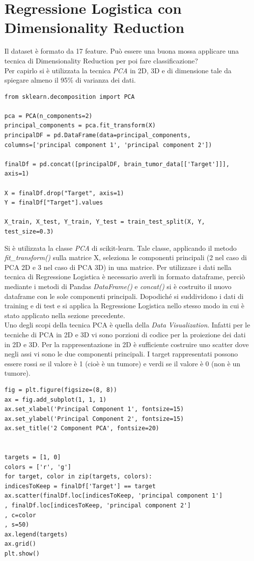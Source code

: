 \section{Regressione Logistica con Dimensionality Reduction}
Il dataset è formato da 17 feature. Può essere una buona mossa applicare una tecnica di Dimensionality Reduction per poi fare classificazione? \\
Per capirlo si è utilizzata la tecnica \textit{PCA} in 2D, 3D e di dimensione tale da spiegare almeno il 95\% di varianza dei dati.
\begin{lstlisting}
from sklearn.decomposition import PCA

pca = PCA(n_components=2)
principal_components = pca.fit_transform(X)
principalDF = pd.DataFrame(data=principal_components,
columns=['principal component 1', 'principal component 2'])

finalDf = pd.concat([principalDF, brain_tumor_data[['Target']]], axis=1)

X = finalDf.drop("Target", axis=1)
Y = finalDf["Target"].values

X_train, X_test, Y_train, Y_test = train_test_split(X, Y, test_size=0.3)
\end{lstlisting}
Si è utilizzata la classe \textit{PCA} di scikit-learn. Tale classe, applicando il metodo \textit{fit\_transform()} sulla matrice X, seleziona le componenti principali (2 nel caso di PCA 2D e 3 nel caso di PCA 3D) in una matrice. Per utilizzare i dati nella tecnica di Regressione Logistica è necessario averli in formato dataframe, perciò mediante i metodi di Pandas \textit{DataFrame()} e \textit{concat()} si è costruito il nuovo dataframe con le sole componenti principali. Dopodiché si suddividono i dati di training e di test e si applica la Regressione Logistica nello stesso modo in cui è stato applicato nella sezione precedente.\\
Uno degli scopi della tecnica PCA è quella della \textit{Data Visualization}. Infatti per le tecniche di PCA in 2D e 3D vi sono porzioni di codice per la proiezione dei dati in 2D e 3D.
Per la rappresentazione in 2D è sufficiente costruire uno scatter dove negli assi vi sono le due componenti principali. I target rappresentati possono essere rossi se il valore è 1 (cioè è un tumore) e verdi se il valore è 0 (non è un tumore).
\newpage
\begin{lstlisting}
fig = plt.figure(figsize=(8, 8))
ax = fig.add_subplot(1, 1, 1)
ax.set_xlabel('Principal Component 1', fontsize=15)
ax.set_ylabel('Principal Component 2', fontsize=15)
ax.set_title('2 Component PCA', fontsize=20)


targets = [1, 0]
colors = ['r', 'g']
for target, color in zip(targets, colors):
indicesToKeep = finalDf['Target'] == target
ax.scatter(finalDf.loc[indicesToKeep, 'principal component 1']
, finalDf.loc[indicesToKeep, 'principal component 2']
, c=color
, s=50)
ax.legend(targets)
ax.grid()
plt.show()
\end{lstlisting}
